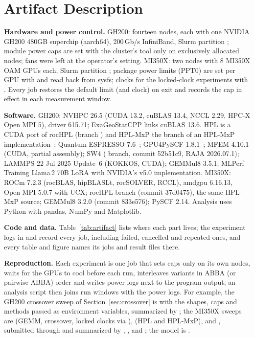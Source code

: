 \documentclass[conference]{IEEEtran}
\begin{document}
\appendices
\section{Artifact Description}\label{app:artifact}

\textbf{Hardware and power control.} GH200: fourteen nodes, each with one NVIDIA GH200 480GB superchip (aarch64), 200\,Gb/s
InfiniBand, Slurm partition ; module power caps are set with the cluster's  tool only on
exclusively allocated nodes; fans were left at the operator's setting. MI350X: two nodes with 8 MI350X OAM GPUs each,
Slurm partition ; package power limits (PPT0) are set per GPU with  and read back
from sysfs; clocks for the locked-clock experiments with . Every job restores the default
limit (and clock) on exit and records the cap in effect in each measurement window.

\textbf{Software.} GH200: NVHPC 26.5 (CUDA 13.2, cuBLAS 13.4, NCCL 2.29, HPC-X Open MPI 5), driver 615.71; ExaGeoStatCPP links
cuBLAS 13.6. HPL is a CUDA port of rocHPL (branch ) and HPL-MxP the 
branch of an HPL-MxP implementation~\cite{Dongarra2025}; Quantum ESPRESSO 7.6~\cite{Giannozzi2020}; GPU4PySCF
1.8.1~\cite{Wu2025,Li2025}; MFEM 4.10.1 (CUDA, partial assembly); SW4 ( branch, commit 52b51c9, RAJA
2026.07.1); LAMMPS 22 Jul 2025 Update~6 (KOKKOS, CUDA); GEMMul8 3.5.1; MLPerf Training Llama\,2 70B LoRA with NVIDIA's
v5.0 implementation. MI350X: ROCm 7.2.3 (rocBLAS, hipBLASLt, rocSOLVER, RCCL), amdgpu 6.16.13, Open MPI 5.0.7 with UCX;
rocHPL branch  (commit 37d0475), the same HPL-MxP source; GEMMul8 3.2.0 (commit
833e576); PySCF 2.14. Analysis uses Python with pandas, NumPy and Matplotlib.

\textbf{Code and data.} Table~\ref{tab:artifact} lists where each part lives; the experiment logs in  and
 record every job, including failed, cancelled and repeated ones, and every table and figure names its jobs
and result files there.

\textbf{Reproduction.} Each experiment is one job that sets caps only on its own nodes, waits for the GPUs to cool
before each run, interleaves variants in ABBA (or pairwise ABBA) order and writes power logs next to the program output;
an analysis script then joins run windows with the power logs. For example, the GH200 crossover sweep of
Section~\ref{sec:crossover} is  with the shapes, caps and methods passed as
environment variables, summarized by ; the MI350X sweeps are
 (GEMM, crossover, locked clocks via ),
 (HPL and HPL-MxP),  and , submitted through
 and summarized by , ,
 and ; the model is .



\end{document}
